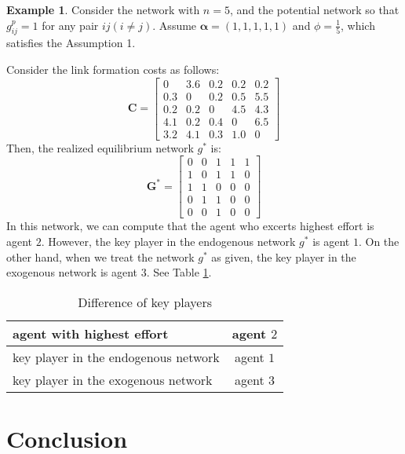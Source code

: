 \documentclass[12pt]{article}
\theoremstyle{definition}
\newtheorem{example}{Example}
\begin{document}
\begin{example}
Consider the network with $n=5$, and the potential network so that $g_{ij}^p = 1$ for any pair $ij(i \neq j)$.
Assume $\bm{\alpha} = (1, 1, 1, 1, 1)$ and $\phi = \frac{1}{5}$, which satisfies the Assumption 1.

Consider the link formation costs as follows:
\[\bm{C} = \left[
			\begin{array}{ccccc}
				0 & 3.6 & 0.2 & 0.2 & 0.2 \\
				0.3 & 0 & 0.2 & 0.5 & 5.5 \\
				0.2 & 0.2 & 0 & 4.5 & 4.3 \\
				4.1 & 0.2 & 0.4 & 0 & 6.5 \\
				3.2 & 4.1 & 0.3 & 1.0 & 0
			\end{array} \right] \]
Then, the realized equilibrium network $g^*$ is:
\[\bm{G}^* = \left[
			\begin{array}{ccccc}
				0 & 0 & 1 & 1 & 1 \\
				1 & 0 & 1 & 1 & 0 \\
				1 & 1 & 0 & 0 & 0 \\
				0 & 1 & 1 & 0 & 0 \\
				0 & 0 & 1 & 0 & 0
			\end{array} \right] \]
In this network, we can compute that the agent who excerts highest effort is agent $2$.
However, the key player in the endogenous network $g^*$ is agent $1$.
On the other hand, when we treat the network $g^*$ as given, the key player in the exogenous network is agent $3$.
See Table \ref{tab:key player}.

\begin{table}[htb]
  \begin{center}
    \begin{tabular}{|l|c|} \hline
      agent with highest effort & agent $2$ \\ \hline
      key player in the endogenous network & agent $1$ \\ \hline
      key player in the exogenous network & agent $3$ \\ \hline
    \end{tabular}
    \caption{Difference of key players}
    \label{tab:key player}
  \end{center}
\end{table}
\end{example}


\section{Conclusion}
\end{document}
